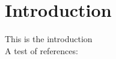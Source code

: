 \chapter*{Introduction}
\label{chapter:introduction}

This is the introduction\\

A test of references: \citep{rodgers:00}




